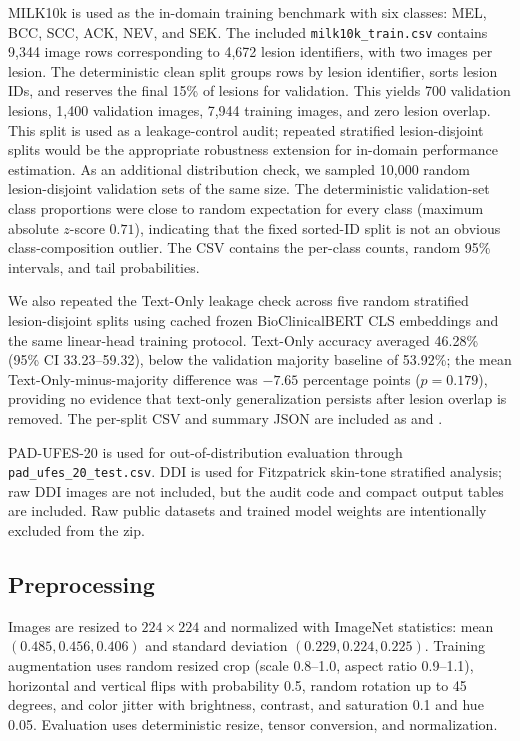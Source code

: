 \documentclass[10pt]{article}
\begin{document}
MILK10k is used as the in-domain training benchmark with six classes:
MEL, BCC, SCC, ACK, NEV, and SEK. The included \texttt{milk10k\_train.csv}
contains 9,344 image rows corresponding to 4,672 lesion identifiers, with
two images per lesion. The deterministic clean split groups rows by lesion
identifier, sorts lesion IDs, and reserves the final 15\% of lesions for
validation. This yields 700 validation lesions, 1,400 validation images,
7,944 training images, and zero lesion overlap. This split is used as a
leakage-control audit; repeated stratified lesion-disjoint splits would be the
appropriate robustness extension for in-domain performance estimation.
As an additional distribution check, we sampled 10,000 random lesion-disjoint
validation sets of the same size. The deterministic validation-set class
proportions were close to random expectation for every class (maximum absolute
$z$-score $0.71$), indicating that the fixed sorted-ID split is not an obvious
class-composition outlier. The CSV
contains the per-class counts, random 95\% intervals, and tail probabilities.

We also repeated the Text-Only leakage check across five random stratified
lesion-disjoint splits using cached frozen BioClinicalBERT CLS embeddings and
the same linear-head training protocol. Text-Only accuracy averaged 46.28\%
(95\% CI 33.23--59.32), below the validation majority baseline of 53.92\%;
the mean Text-Only-minus-majority difference was $-7.65$ percentage points
($p=0.179$), providing no evidence that text-only generalization persists after
lesion overlap is removed. The per-split CSV and summary JSON are included as
 and
.

PAD-UFES-20 is used for out-of-distribution evaluation through
\texttt{pad\_ufes\_20\_test.csv}. DDI is used for Fitzpatrick skin-tone
stratified analysis; raw DDI images are not included, but the audit code and
compact output tables are included. Raw public datasets and trained model
weights are intentionally excluded from the zip.

\subsection*{Preprocessing}

Images are resized to $224\times224$ and normalized with ImageNet statistics:
mean $(0.485, 0.456, 0.406)$ and standard deviation
$(0.229, 0.224, 0.225)$. Training augmentation uses random resized crop
(scale 0.8--1.0, aspect ratio 0.9--1.1), horizontal and vertical flips
with probability 0.5, random rotation up to 45 degrees, and color jitter
with brightness, contrast, and saturation 0.1 and hue 0.05. Evaluation uses
deterministic resize, tensor conversion, and normalization.
\end{document}
